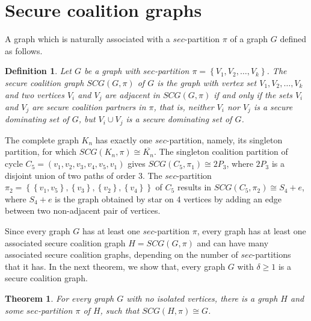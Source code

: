 \documentclass[12pt]{article}
\newtheorem{theorem}{Theorem}[section]
\newtheorem{definition}{Definition}
\begin{document}
\section{Secure coalition graphs}
    A graph which is naturally associated with a $sec$-partition $\pi$ of a graph $G$ defined as follows.
\begin{definition}
    Let $G$ be a graph with $sec$-partition $\pi=\left\{V_1,V_2,\dots,V_k\right\}$. The secure coalition graph $SCG(G,\pi)$ of $G$ is the graph with vertex set $V_1,V_2,\dots,V_k$ and two vertices $V_i$ and $V_j$ are adjacent in $SCG(G,\pi)$ if and only if the sets $V_i$ and $V_j$ are secure coalition partners in $\pi$, that is, neither $V_i$ nor $V_j$ is a secure dominating set of $G$, but $V_i\cup V_j$ is a secure dominating set of $G$.\end{definition}
     The complete graph $K_n$ has exactly one $sec$-partition, namely, its singleton partition, for which $SCG(K_n,\pi)\cong \overline{K_n}$. The singleton coalition partition of cycle $C_5=(v_1,v_2,v_3,v_4,v_5,v_1)$ gives $SCG(C_5,\pi_1)\cong 2P_3$, where $2P_3$ is a disjoint union of two paths of order $3$. The $sec$-partition $\pi_2=\left\{\left\{v_1,v_5\right\},\left\{v_3\right\},\left\{v_2\right\},\left\{v_4\right\}\right\}$ of $C_5$ results in $SCG(C_5,\pi_2)\cong S_4+e$, where $S_4+e$ is the graph obtained by star on $4$ vertices by adding an edge between two non-adjacent pair of vertices. \par
    Since every graph $G$ has at least one $sec$-partition $\pi$, every graph has at least one associated secure coalition graph $H = SCG(G,\pi)$ and can have many associated secure coalition
graphs, depending on the number of $sec$-partitions that it has. In the next theorem, we show that, every graph $G$ with $\delta\ge 1$ is a secure coalition graph.
\begin{theorem}\label{spi}
For every graph $G$ with no isolated vertices, there is a graph $H$ and some $sec$-partition $\pi$ of $H$, such that $SCG(H,\pi)\cong G$.
\end{theorem}
\end{document}
